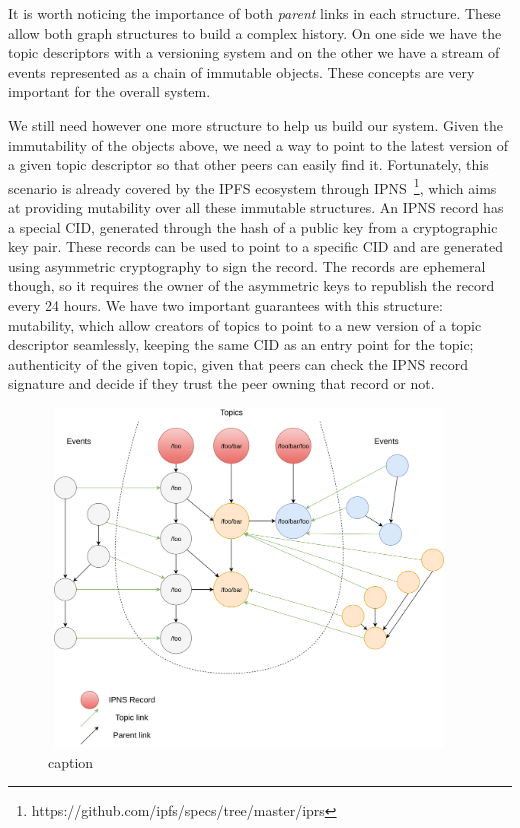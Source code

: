 It is worth noticing the importance of both \emph{parent} links in each
structure. These allow both graph structures to build a complex history.
On one side we have the topic descriptors with a versioning system and
on the other we have a stream of events represented as a chain of
immutable objects. These concepts are very important for the overall
system.

We still need however one more structure to help us build our system.
Given the immutability of the objects above, we need a way to point to
the latest version of a given topic descriptor so that other peers can
easily find it. Fortunately, this scenario is already covered by the
IPFS ecosystem through IPNS~\footnote{https://github.com/ipfs/specs/tree/master/iprs}, which aims at
providing mutability over all these immutable structures. An IPNS record
has a special CID, generated through the hash of a public key from a
cryptographic key pair. These records can be used to point to a specific
CID and are generated using asymmetric cryptography to sign the record.
The records are ephemeral though, so it requires the owner of the
asymmetric keys to republish the record every 24 hours. We have two
important guarantees with this structure: mutability, which allow
creators of topics to point to a new version of a topic descriptor
seamlessly, keeping the same CID as an entry point for the topic;
authenticity of the given topic, given that peers can check the IPNS
record signature and decide if they trust the peer owning that record or
not.

\begin{figure}[hb!]
  \centering
  \includegraphics[max height=9cm,max width=0.95\textwidth]{img/solution-arch.png}
  \caption{caption}
  \label{fig:solution-arch}
\end{figure}

